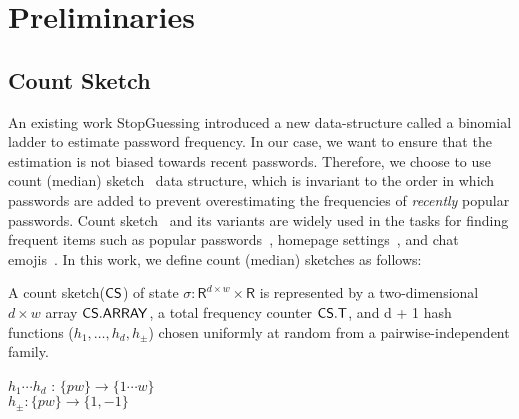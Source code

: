 


\section{Preliminaries} \label{section:Prelinmaries}




\subsection{Count Sketch}\label{section:Prelinmaries-CountSketch} %


An existing work StopGuessing\cite{EuroSP:THS19} introduced a new data-structure called a binomial ladder to estimate password frequency. In our case, we want to ensure that the estimation is not biased towards recent passwords. Therefore, we choose to use count (median) sketch~\cite{ICALP:ChaCheFar02} data structure, which is invariant to the order in which passwords are added to prevent overestimating the frequencies of \textit{recently} popular passwords. Count sketch~\cite{ICALP:ChaCheFar02} and its variants are widely used in the tasks for finding frequent items such as popular passwords~\cite{CCS:NaoPinRon19}, homepage settings~\cite{CCS:ErlPihKor14}, and chat emojis~\cite{AppleDP}. In this work, we define count (median) sketches as follows:


\begin{definition}
	
	A count sketch($\mathsf{CS}$) of state $\sigma: \mathsf{R}^{d\times w} \times \mathsf{R}$ is represented by a two-dimensional $d\times w$ array $\mathsf{CS.ARRAY}$, a total frequency counter $\mathsf{CS.T}$, and d + 1 hash functions ($h_1, \ldots, h_d, h_{\pm}$) chosen uniformly at random from a pairwise-independent family. 
	
	\begin{center}
		
		$h_1 \cdots h_d$ : $\{pw\} \rightarrow \{1\cdots w\}$\\
		
		$h_{\pm} : \{pw\} \rightarrow \{1, -1\}$\\
		
	\end{center}
	
\end{definition}


